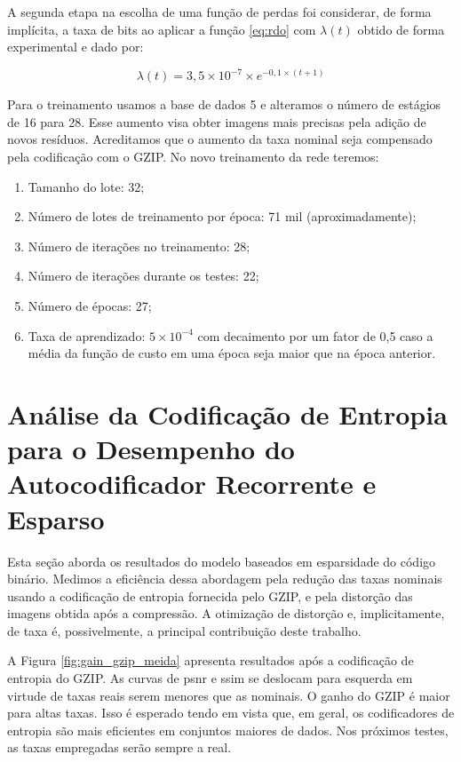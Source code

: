 A segunda etapa na escolha de uma função de perdas foi considerar, de forma implícita, a taxa de bits ao aplicar a função \ref{eq:rdo} com $\lambda(t)$ obtido de forma experimental e dado por: 

\begin{equation}
\lambda(t) = 3,5 \times 10^{-7} \times e^{-0,1 \times (t+1)}  
\end{equation}

Para o treinamento usamos a base de dados 5 e alteramos o número de estágios de 16 para 28. Esse aumento visa obter imagens mais precisas pela adição de novos resíduos. Acreditamos que o aumento da taxa nominal seja compensado pela codificação com o GZIP. No novo treinamento da rede teremos:

\begin{enumerate}
	\label{enum:hiper_param2}
	\item Tamanho do lote: 32;  
	\item Número de lotes de treinamento por época: 71 mil (aproximadamente);   
	\item Número de iterações no treinamento: 28;
	\item Número de iterações durante os testes: 22;
	\item Número de épocas: 27;
	\item Taxa de aprendizado: $5 \times {10}^{-4}$ com decaimento por um fator de 0,5 caso a média da função de custo em uma época seja maior que na época anterior.
\end{enumerate}


\section{Análise da Codificação de Entropia para o Desempenho do Autocodificador Recorrente e Esparso}

Esta seção aborda os resultados do modelo baseados em esparsidade do código binário. Medimos a eficiência dessa abordagem pela redução das taxas nominais usando a codificação de entropia fornecida pelo GZIP, e pela distorção das imagens obtida após a compressão. A otimização de distorção e, implicitamente, de taxa é, possivelmente, a principal contribuição deste trabalho.    


A Figura \ref{fig:gain_gzip_meida} apresenta resultados após a codificação de entropia do GZIP. As curvas de \acrshort{psnr} e \acrshort{ssim} se deslocam para esquerda em virtude de taxas reais serem menores que as nominais. O ganho do GZIP é maior para altas taxas. Isso é esperado tendo em vista que, em geral, os codificadores de entropia são mais eficientes em conjuntos maiores de dados. Nos próximos testes, as taxas empregadas serão sempre a real.    

